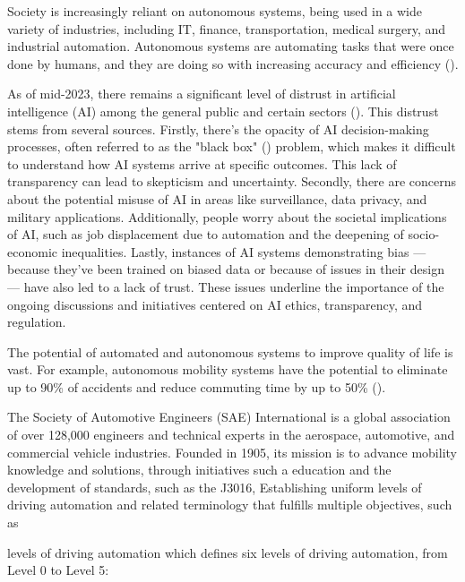 Society is increasingly reliant on autonomous systems,  being used in a wide variety of industries, including IT, finance, transportation, medical surgery, and industrial automation. Autonomous systems are automating tasks that were once done by humans, and they are doing so with increasing accuracy and efficiency (\cite{ebert2019validation}).



As of mid-2023, there remains a significant level of distrust in artificial intelligence (AI) among the general public and certain sectors (\cite{futureoflife2023pausegiantai}). This distrust stems from several sources. Firstly, there's the opacity of AI decision-making processes, often referred to as the "black box" (\cite{burrell2016}) problem, which makes it difficult to understand how AI systems arrive at specific outcomes. This lack of transparency can lead to skepticism and uncertainty. Secondly, there are concerns about the potential misuse of AI in areas like surveillance, data privacy, and military applications. Additionally, people worry about the societal implications of AI, such as job displacement due to automation and the deepening of socio-economic inequalities. Lastly, instances of AI systems demonstrating bias — because they've been trained on biased data or because of issues in their design — have also led to a lack of trust. These issues underline the importance of the ongoing discussions and initiatives centered on AI ethics, transparency, and regulation.

The potential of automated and autonomous systems to improve quality of life is vast. For example, autonomous mobility systems have the potential to eliminate up to 90\% of accidents and reduce commuting time by up to 50\% (\cite{kalra2016driving}).

The Society of Automotive Engineers (SAE) \cite{sae_org} International  is a global association of over 128,000 engineers and technical experts in the aerospace, automotive, and commercial vehicle industries. Founded in 1905, its mission is to advance mobility knowledge and solutions, through initiatives such a education and the development of standards, such as the J3016, Establishing uniform levels of driving automation and related terminology that fulfills multiple objectives, such as

levels of driving automation which defines six levels of driving automation, from Level 0 to Level 5:


